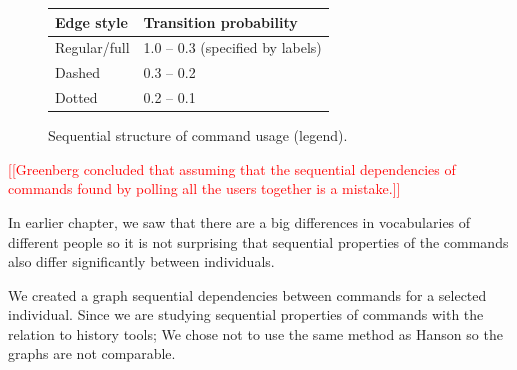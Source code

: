 \documentclass[thesis=M,english]{FITthesis}[2012/10/20]
\newcommand{\redtext}[1]{\textcolor{red}{[[#1]]}}
\begin{document}
\begin{figure}

\centering
\begin{tabular}{|l|l|}
\hline
Edge style & Transition probability            \\\hline
Regular/full     & 1.0 -- 0.3 (specified by labels) \\
Dashed      & 0.3 -- 0.2                         \\
Dotted      & 0.2 -- 0.1                         \\
\hline
\end{tabular}
\caption{Sequential structure of command usage (legend).}
\label{tab:seq-table}
\end{figure}






\redtext{Greenberg concluded that assuming that the sequential dependencies of commands found by polling all the users together is a mistake.}

In earlier chapter, we saw that there are a big differences in vocabularies of different people so it is not surprising that sequential properties of the commands also differ significantly between individuals.

We created a graph sequential dependencies between commands for a selected individual. Since we are studying sequential properties of commands with the relation to history tools; We chose not to use the same method as Hanson so the graphs are not comparable. 
\end{document}
